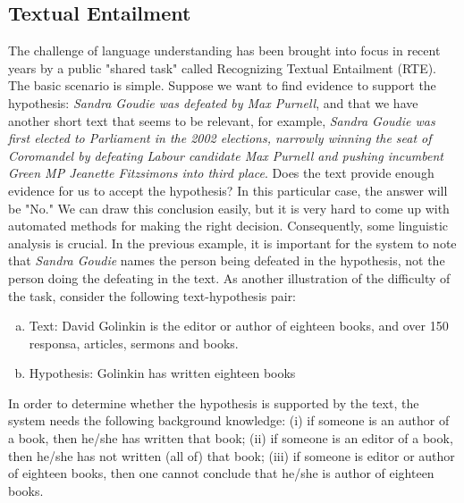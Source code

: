 \subsection{Textual Entailment}
The challenge of language understanding has been brought into focus in recent years by a public "shared task" called Recognizing Textual Entailment (RTE). The basic scenario is simple. Suppose we want to find evidence to support the hypothesis: \emph{Sandra Goudie was defeated by Max Purnell}, and that we have another short text that seems to be relevant, for example, \emph{Sandra Goudie was first elected to Parliament in the 2002 elections, narrowly winning the seat of Coromandel by defeating Labour candidate Max Purnell and pushing incumbent Green MP Jeanette Fitzsimons into third place}. Does the text provide enough evidence for us to accept the hypothesis? In this particular case, the answer will be "No." We can draw this conclusion easily, but it is very hard to come up with automated methods for making the right decision.
Consequently, some linguistic analysis is crucial. In the previous example, it is important for the system to note that \emph{Sandra Goudie} names the person being defeated in the hypothesis, not the person doing the defeating in the text. As another illustration of the difficulty of the task, consider the following text-hypothesis pair:
\begin{enumerate}[a.]
    \item Text: David Golinkin is the editor or author of eighteen books, and over 150 responsa, articles, sermons and books.
    \item Hypothesis: Golinkin has written eighteen books
    
\end{enumerate}

In order to determine whether the hypothesis is supported by the text, the system needs the following background knowledge: (i) if someone is an author of a book, then he/she has written that book; (ii) if someone is an editor of a book, then he/she has not written (all of) that book; (iii) if someone is editor or author of eighteen books, then one cannot conclude that he/she is author of eighteen books.

